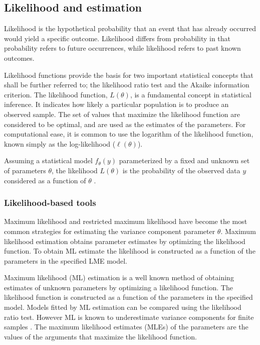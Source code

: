 \documentclass[12pt, a4paper]{report}
\theoremstyle{plain}
\theoremstyle{definition}
\theoremstyle{remark}
\begin{document}
	
	
	
	
	
	
	\subsection{Likelihood and estimation}
	Likelihood is the hypothetical probability that an event that has
	already occurred would yield a specific outcome. Likelihood
	differs from probability in that probability refers to future
	occurrences, while likelihood refers to past known outcomes.
	
	
	Likelihood functions provide the basis for two important statistical concepts that shall be further referred to; the likelihood ratio test and the Akaike information criterion. The likelihood function, $L(\theta)$, is a fundamental concept in statistical
	inference. It indicates how likely a particular population is to produce an observed sample. The set of values that maximize the
	likelihood function are considered to be optimal, and are used as the estimates of the parameters. For computational ease, it is common to use the logarithm of the likelihood function, known simply as the log-likelihood ($\ell(\theta)$).
	
	Assuming a statistical model $f_{\theta}(y)$ parameterized by a fixed and unknown set of parameters $\theta$, the likelihood $L(\theta)$ is the probability of the observed data $y$ considered as a function of $\theta$ \citep{YLee}.
	
	\subsubsection{Likelihood-based tools}
	
	Maximum likelihood and restricted maximum likelihood have become the most common strategies for estimating the variance component parameter $\theta.$ Maximum likelihood estimation obtains
	parameter estimates by optimizing the likelihood function. To obtain ML estimate the likelihood is constructed as a function of the parameters in the specified LME model. 
	
	Maximum likelihood (ML) estimation is a well known method of
	obtaining estimates of unknown parameters by optimizing a likelihood function.  The
	likelihood function is constructed as a function of the parameters
	in the specified model. Models fitted by ML estimation can be compared using the likelihood ratio test. However ML is known to underestimate variance components for finite samples \citep{Demi}. The maximum likelihood estimates (MLEs) of the parameters are the values of the arguments that maximize the likelihood function. 
	
\end{document}
